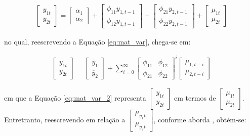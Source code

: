 \begin{ceqn}
\begin{align} \label{eq:mat_var}
\begin{bmatrix}
y_{1t} \\
y_{2t}
\end{bmatrix}
=
\begin{bmatrix}
\alpha_{1} \\
\alpha_{2}
\end{bmatrix}
+
\begin{bmatrix}
\phi_{11} y_{1, t-1} \\
\phi_{12} y_{1, t-1}
\end{bmatrix}
+
\begin{bmatrix}
\phi_{21} y_{2, t-1} \\
\phi_{22} y_{2, t-1}
\end{bmatrix}
+
\begin{bmatrix}
\mu_{1t} \\
\mu_{2t}
\end{bmatrix}
\end{align}
\end{ceqn} no qual, reescrevendo a Equação \eqref{eq:mat_var}, chega-se em:

\begin{ceqn}
\begin{align} \label{eq:mat_var_2}
\begin{bmatrix}
y_{1t} \\
y_{2t}
\end{bmatrix}
=
\begin{bmatrix}
\overline{y}_{1} \\
\overline{y}_{2}
\end{bmatrix}
+
\sum_{i=0}^{\infty}{\begin{bmatrix} \phi_{11} & \phi_{12} \\ \phi_{21} & \phi_{22} \end{bmatrix}^i}
\begin{bmatrix}
\mu_{1, t-i} \\
\mu_{2, t-i}
\end{bmatrix}
\end{align}
\end{ceqn} em que a Equação \eqref{eq:mat_var_2} representa $\begin{bmatrix} y_{1t} \\ y_{2t} \end{bmatrix}$ em termos de $\begin{bmatrix} \mu_{1t} \\ \mu_{2t} \end{bmatrix}$. Entretranto, reescrevendo em relação a $\begin{bmatrix} \mu_{y_{1}t} \\ \mu_{y_{2}t} \end{bmatrix}$, conforme aborda , obtém-se:


